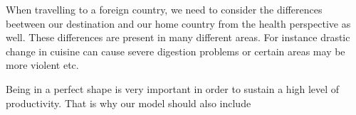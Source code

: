 
When travelling to a foreign country, we need to consider the differences beetween our destination and our home country from the health perspective as well. These differences are present in many different areas. For instance drastic change in cuisine can cause severe digestion problems or certain areas may be more violent etc. 

Being in a perfect shape is very important in order to sustain a high level of productivity. That is why our model should also include

